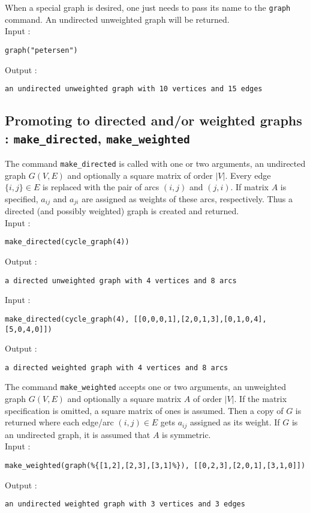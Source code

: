\documentclass[a4paper,11pt]{article}
\begin{document}
When a special graph is desired, one just needs to pass its name to the {\tt graph} command. An undirected unweighted graph will be returned.\\
Input :
\begin{center}
  \tt graph("petersen")
\end{center}
Output :
\begin{center}
  \tt an undirected unweighted graph with 10 vertices and 15 edges
\end{center}

\subsection{Promoting to directed and/or weighted graphs : {\tt make\_directed}, {\tt make\_weighted}}

The command {\tt make\_directed} is called with one or two arguments, an undirected graph $ G(V,E) $ and optionally a square matrix of order $ |V| $. Every edge $ \{i,j\}\in E $ is replaced with the pair of arcs $ (i,j) $ and $ (j,i) $. If matrix $ A $ is specified, $ a_{ij} $ and $ a_{ji} $ are assigned as weights of these arcs, respectively. Thus a directed (and possibly weighted) graph is created and returned.\\
Input :
\begin{center}
  \tt make\_directed(cycle\_graph(4))
\end{center}
Output :
\begin{center}
  \tt a directed unweighted graph with 4 vertices and 8 arcs
\end{center}
Input :
\begin{center}
   \tt make\_directed(cycle\_graph(4), [[0,0,0,1],[2,0,1,3],[0,1,0,4],[5,0,4,0]])
\end{center}
Output :
\begin{center}
  \tt a directed weighted graph with 4 vertices and 8 arcs
\end{center}

The command {\tt make\_weighted} accepts one or two arguments, an unweighted graph $ G(V,E) $ and optionally a square matrix $ A $ of order $ |V| $. If the matrix specification is omitted, a square matrix of ones is assumed. Then a copy of $ G $ is returned where each edge/arc $ (i,j)\in E $ gets $ a_{ij} $ assigned as its weight. If $ G $ is an undirected graph, it is assumed that $ A $ is symmetric.\\
Input :
\begin{center}
  \tt make\_weighted(graph(\%\{[1,2],[2,3],[3,1]\%\}), [[0,2,3],[2,0,1],[3,1,0]])
\end{center}
Output :
\begin{center}
  \tt an undirected weighted graph with 3 vertices and 3 edges
\end{center}
\end{document}
